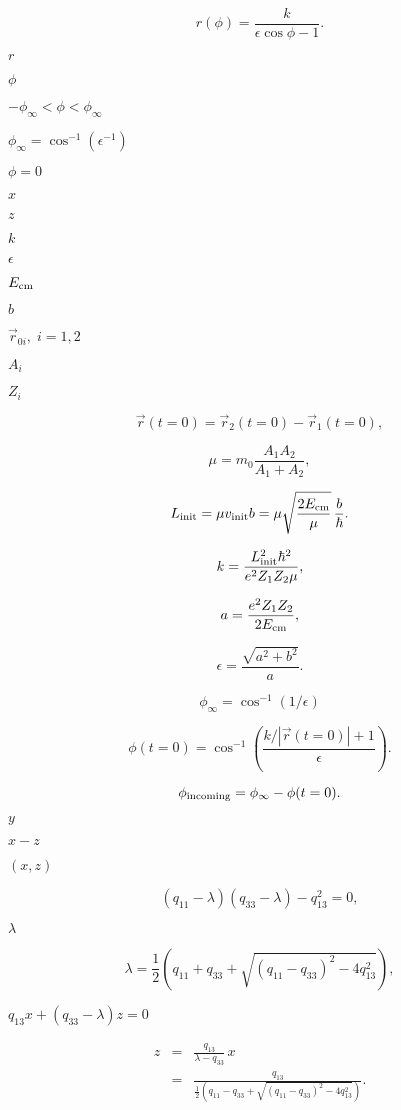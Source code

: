 \documentclass{article}
\begin{document}
\[r(\phi)=\frac{k}{\epsilon\cos\phi-1}.\]
\pagebreak

$r$
\pagebreak

$\phi$
\pagebreak

$-\phi_\infty<\phi<\phi_\infty$
\pagebreak

$\phi_\infty=\cos^{-1}(\epsilon^{-1})$
\pagebreak

$\phi=0$
\pagebreak

$x$
\pagebreak

$z$
\pagebreak

$k$
\pagebreak

$\epsilon$
\pagebreak

$E_{\rm cm}$
\pagebreak

$b$
\pagebreak

$\vec r_{0i},\;i=1,2$
\pagebreak

$A_i$
\pagebreak

$Z_i$
\pagebreak

\[\vec r(t=0)=\vec r_2(t=0)-\vec r_1(t=0),\]
\pagebreak

\[\mu=m_0\frac{A_1A_2}{A_1+A_2},\]
\pagebreak

\[L_{\rm init}=\mu v_{\rm init}b=\mu\sqrt{\frac{2E_{\rm cm}}{\mu}}\, \frac{b}{\hbar}.\]
\pagebreak

\[ k=\frac{L_{\rm init}^2\hbar^2}{e^2Z_1Z_2\mu},\]
\pagebreak

\[a=\frac{e^2Z_1Z_2}{2E_{\rm cm}},\]
\pagebreak

\[\epsilon=\frac{\sqrt{a^2+b^2}}{a}.\]
\pagebreak

\[\phi_\infty=\cos^{-1}(1/\epsilon)\]
\pagebreak

\[\phi(t=0)=\cos^{-1}\left(\frac{k/|\vec r(t=0)|+1}{\epsilon}\right).\]
\pagebreak

\[\phi_{\rm incoming}=\phi_\infty-\phi(t=0).\]
\pagebreak

$y$
\pagebreak

$x-z $
\pagebreak

$(x,z)$
\pagebreak

\[(q_{11}-\lambda)(q_{33}-\lambda)-q_{13}^2=0,\]
\pagebreak

$\lambda$
\pagebreak

\[\lambda=\frac1{2}\left(q_{11}+q_{33}+\sqrt{(q_{11}-q_{33})^2 -4q_{13}^2}\right),\]
\pagebreak

$q_{13}x+(q_{33}-\lambda)z=0$
\pagebreak

\begin{eqnarray*} z&=&\frac{q_{13}}{\lambda-q_{33}}\,x\\ &=& \frac{q_{13}}{\frac1{2}\left(q_{11}-q_{33}+\sqrt{(q_{11}-q_{33})^2 -4q_{13}^2}\right)}. \end{eqnarray*}
\pagebreak
\end{document}
